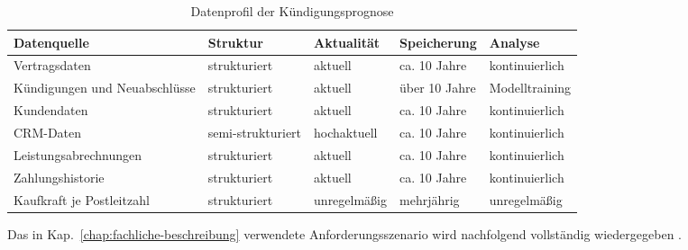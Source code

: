\begin{table}[H]
  \centering
  \footnotesize
  \setlength{\tabcolsep}{3pt}
  \renewcommand{\arraystretch}{0.9}
  \caption{Datenprofil der Kündigungsprognose}
  \label{tab:daten-churn}
  \begin{tabularx}{\textwidth}{@{}
    >{\raggedright\arraybackslash}p{5cm}
    >{\raggedright\arraybackslash}p{2.8cm}
    >{\raggedright\arraybackslash}p{2.0cm}
    >{\raggedright\arraybackslash}p{2.3cm}
    >{\raggedright\arraybackslash}X@{}}
    \toprule
    Datenquelle & Struktur & Aktualität & Speicherung & Analyse \\
    \midrule
    Vertragsdaten
      & strukturiert & aktuell & ca. 10 Jahre & kontinuierlich \\
    Kündigungen und Neuabschlüsse
      & strukturiert & aktuell & über 10 Jahre & Modelltraining \\
    Kundendaten
      & strukturiert & aktuell & ca. 10 Jahre & kontinuierlich \\
    CRM-Daten
      & semi-strukturiert & hochaktuell & ca. 10 Jahre & kontinuierlich \\
    Leistungs\-abrechnungen
      & strukturiert & aktuell & ca. 10 Jahre & kontinuierlich \\
    Zahlungshistorie
      & strukturiert & aktuell & ca. 10 Jahre & kontinuierlich \\
    Kaufkraft je Postleitzahl
      & strukturiert & unregelmäßig & mehrjährig & unregelmäßig \\
    \bottomrule
  \end{tabularx}
\end{table}

\clearpage


\clearpage


\medskip
\noindent
Das in Kap.~\ref{chap:fachliche-beschreibung} verwendete
Anforderungsszenario wird nachfolgend vollständig wiedergegeben
\citep{nordakademieSzenarioVersicherung}.




